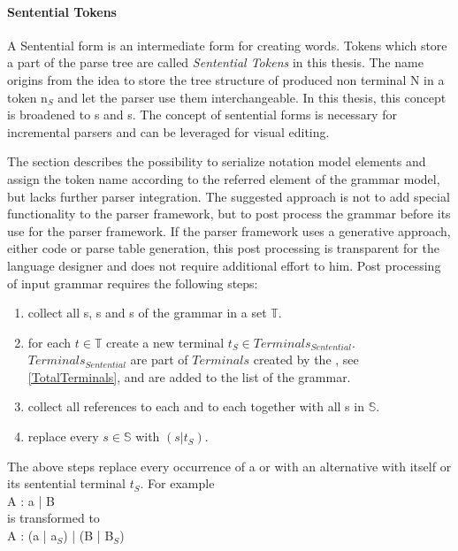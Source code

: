 \paragraph{Sentential Tokens}
A Sentential form is an intermediate form for creating words. Tokens which store a part of the parse tree are called \emph{Sentential Tokens} in this thesis. The name origins from the idea to store the tree structure of produced non terminal N in a token n$_S$ and let the parser use them interchangeable. In this thesis, this concept is broadened to s and s. The concept of sentential forms is necessary for incremental parsers and can be leveraged for visual editing.
 
The   section describes the possibility to serialize notation model elements and assign the token name according to the referred element of the grammar model, but lacks further parser integration. The suggested approach is not to add special functionality to the parser framework, but to post process the grammar before its use for the parser framework. If the parser framework uses a generative approach, either code or parse table generation, this post processing is transparent for the language designer and does not require additional effort to him. 
Post processing of input grammar requires the following steps:
\begin{enumerate}
	\item collect all s, s and s of the grammar in a set $\mathbb{T}$.
	\item for each $t \in \mathbb{T}$ create a new terminal $t_S \in Terminals_{Sentential}$.\\ $Terminals_{Sentential}$ are part of $Terminals$ created by the , see \ref{TotalTerminals}, and are added to the  list of the grammar.
	\item collect all references to each  and to each  together with all s in $\mathbb{S}$.
	\item replace every $s \in \mathbb{S}$ with $(s | t_S)$.
\end{enumerate}
  
The above steps replace every occurrence of a  or  with an alternative with itself or its sentential terminal $t_S$. 
For example\\
A : a | B \\
is transformed to  \\
A : (a | a$_S$) | (B | B$_S$) \\

